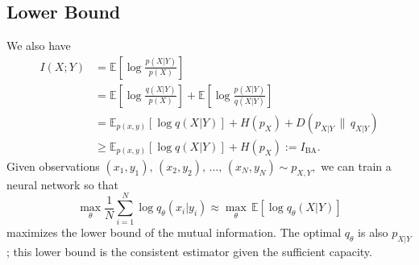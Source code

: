 \subsection{Lower Bound}
We also have
\[
\begin{aligned}
    I(X;Y) &= \mathbb{E}\left[\log\frac{p(X|Y)}{p(X)}\right]\\
    &= \mathbb{E}\left[\log\frac{q(X|Y)}{p(X)}\right]+\mathbb{E}\left[\log\frac{p(X|Y)}{q(X|Y)}\right]\\&=\mathbb{E}_{p(x,y)}\left[\log q(X|Y)\right]+H(p_X)+D(p_{X|Y}\,\|\,q_{X|Y})\\&\geq\mathbb{E}_{p(x,y)}\left[\log q(X|Y)\right]+H(p_X) := I_{\text{BA}}.\end{aligned}
\]
Given observations $(x_1,y_1),\,(x_2,y_2),\,...,\,(x_N,y_N)\sim p_{X,Y},$ we can train a neural network so that 
\[
\underset{\theta}{\max}\frac{1}{N}\sum_{i=1}^N\log q_{\theta}(x_i|y_i)\approx\underset{\theta}{\max}\,\mathbb{E}[\log q_{\theta}(X|Y)]
\]
maximizes the lower bound of the mutual information. The optimal $q_{\theta}$ is also $p_{X|Y}$; this lower bound is the consistent estimator given the sufficient capacity.


